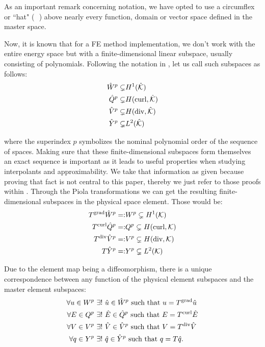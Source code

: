 As an important remark concerning notation, we have opted to use a circumflex or ``hat" ( $\hat{}$ ) above nearly every function, domain or vector space defined in the master space.

Now, it is known that for a FE method implementation, we don't work with the entire energy space but with a finite-dimensional linear subspace, usually consisting of polynomials. Following the notation in \cite{hpbook2,Fuentes2015}, let us call such subspaces as follows:
% 
\begin{align*}
    \hat{W}^p\subsetneq&H^1(\hat{\mathcal{K}}) \\
    \hat{Q}^p\subsetneq&H(\operatorname{curl},\hat{\mathcal{K}}) \\
    \hat{V}^p\subsetneq&H(\operatorname{div},\hat{\mathcal{K}}) \\
    \hat{Y}^p\subsetneq&L^2(\hat{\mathcal{K}})
\end{align*}

\noindent where the superindex $p$ symbolizes the nominal polynomial order of the sequence of spaces. Making sure that these finite-dimensional subspaces form themselves an exact sequence is important as it leads to useful properties when studying interpolants and approximability. We take that information as given because proving that fact is not central to this paper, thereby we just refer to those proofs within \cite{hpbook2}. Through the Piola transformations we can get the resulting finite-dimensional subspaces in the physical space element. Those would be:
% 
\begin{equation}
\begin{aligned}
    T^{\operatorname{grad}}\hat{W}^p=:&W^p\subsetneq H^1(\mathcal{K}) \\
    T^{\operatorname{curl}}\hat{Q}^p=:&Q^p\subsetneq H(\operatorname{curl},\mathcal{K}) \\
    T^{\operatorname{div}}\hat{V}^p=:&V^p\subsetneq H(\operatorname{div},\mathcal{K}) \\
    T\hat{Y}^p=:&Y^p\subsetneq L^2(\mathcal{K})
\end{aligned}
\label{finitedimspaces}
\end{equation}

Due to the element map being a diffeomorphism, there is a unique correspondence between any function of the physical element subspaces and the master element subspaces:
% 
\begin{align}
    \forall u\in W^p\ &\exists !\ \hat{u}\in\hat{W}^p\text{ such that }u=T^{\operatorname{grad}}\hat{u}\\
    \forall E\in Q^p\ &\exists !\ \hat{E}\in\hat{Q}^p\text{ such that }E=T^{\operatorname{curl}}\hat{E}\\
    \forall V\in V^p\ &\exists !\ \hat{V}\in\hat{V}^p\text{ such that }V=T^{\operatorname{div}}\hat{V}\\
    \forall q\in Y^p\ &\exists !\ \hat{q}\in\hat{Y}^p\text{ such that }q=T\hat{q}.
\end{align}

